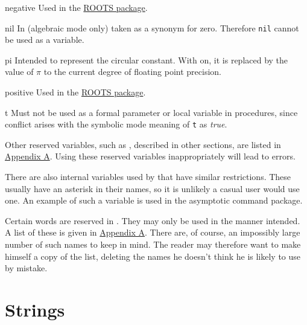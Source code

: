 \begin{list}{}
\item[negative] Used in the \hyperlink{package:ROOTS}{ROOTS package}.

\item[nil] In {\REDUCE} (algebraic mode only)
taken as a synonym for zero.  Therefore \texttt{nil} cannot be used as a
variable.

\item[pi] Intended to represent the circular%
%
constant.  With  on, it is replaced by the value of $\pi$ to
the current degree of floating point precision.

\item[positive] Used in the \hyperlink{package:ROOTS}{ROOTS package}.

\item[t] Must not be used as a formal%
%
parameter or local variable in procedures, since conflict arises with the
symbolic mode meaning of \texttt{t} as \emph{true}.
\end{list}

Other reserved variables, such as
\hyperlink{reserved:LOW_POW}{}, described in other
sections, are listed in \hyperlink{sec:appendixa}{Appendix A}.  Using
these reserved variables inappropriately will
lead to errors.

There are also internal variables used by {\REDUCE} that have similar
restrictions. These usually have an asterisk in their names, so it is
unlikely a casual user would use one. An example of such a variable is
 used in the asymptotic command package.

Certain words are reserved in {\REDUCE}. They may only be used in the manner
intended. A list of these is given in \hyperlink{sec:appendixa}{Appendix A}.
There are, of course, an impossibly large number of such names to keep in
mind. The reader may therefore want to make himself a copy of the list,
deleting the names he doesn't think he is likely to use by mistake.

\section{Strings}

